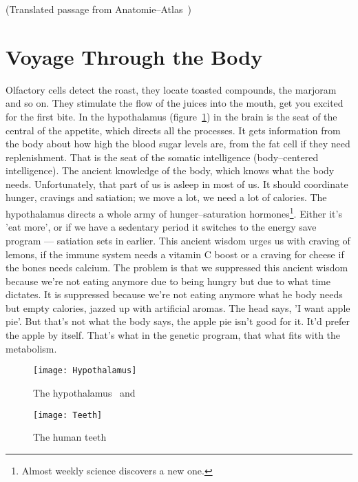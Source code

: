 \documentclass[../main.tex]{subfiles}
\begin{document}
(Translated passage from Anatomie--Atlas~\cite{AAtlas})
\section{Voyage Through the Body}

Olfactory cells detect the roast, they locate toasted compounds, the marjoram and so on.
They stimulate the flow of the juices into the mouth, get you excited for the first bite.
In the hypothalamus (figure~\ref{hypothalamus}) in the brain is the seat of the central of the appetite, which directs all the processes.
It gets information from the body about how high the blood sugar levels are, from the fat cell if they need replenishment.
That is the seat of the somatic intelligence (body--centered intelligence).
The ancient knowledge of the body, which knows what the body needs.
Unfortunately, that part of us is asleep in most of us.
It should coordinate hunger, cravings and satiation; we move a lot, we need a lot of calories.
The hypothalamus directs a whole army of hunger--saturation hormones\footnote{Almost weekly science discovers a new one.}.
Either it's 'eat more', or if we have a sedentary period it switches to the energy save program --- satiation sets in earlier.
This ancient wisdom urges us with craving of lemons, if the immune system needs a vitamin C boost or a craving for cheese if the bones needs calcium.
The problem is that we suppressed this ancient wisdom because we're not eating anymore due to being hungry but due to what time dictates.
It is suppressed because we're not eating anymore what he body needs but empty calories, jazzed up with artificial aromas.
The head says, 'I want apple pie'. But that's not what the body says, the apple pie isn't good for it. It'd prefer the apple by itself.
That's what in the genetic program, that what fits with the metabolism.

\begin{figure}[h]
\texttt{[image: Hypothalamus]}
  \caption{The hypothalamus~\cite{hypothalamus} and~\cite{hypothalamus-detail}}\label{hypothalamus}
\end{figure}



\begin{figure}[htb!]
  \texttt{[image: Teeth]}
  \caption{The human teeth~\cite{SciAnim}}\label{teeth}
\end{figure}
\end{document}
